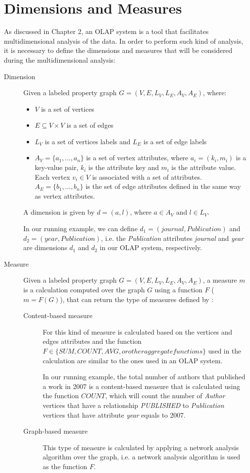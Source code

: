 \section{Dimensions and Measures}

As discussed in Chapter 2, an OLAP system is a tool that facilitates multidimensional analysis of the data. In order to perform such kind of analysis, it is necessary to define the dimensions and measures that will be considered during the multidimensional analysis:
\begin{description}
\item[Dimension] Given a labeled property graph $G = (V, E, L_V, L_E, A_V, A_E)$, where:
\begin{itemize}
\item $V$ is a set of vertices
\item $E \subseteq V \times V$ is a set of edges
\item $L_V$ is a set of vertices labels and $L_E$ is a set of edge labels
\item $A_V = \{a_1, \dots, a_n\}$ is a set of vertex attributes, where $a_i = (k_i, m_i)$ is a key-value pair, $k_i$ is the attribute key and $m_i$ is the attribute value. Each vertex $v_i \in V$ is associated with a set of attributes. $A_E = \{b_1, \dots, b_n\}$ is the set of edge attributes defined in the same way as vertex attributes.
\end{itemize}
 A dimension is given by $d = (a, l)$, where $a \in A_V$ and $l \in L_V$.

In our running example, we can define $d_1 = (journal, Publication)$ and $d_2 = (year, Publication)$, i.e. the \emph{Publication} attributes \emph{journal} and \emph{year} are dimensions $d_1$ and $d_2$ in our OLAP system, respectively.

\item[Measure] Given a labeled property graph $G = (V, E, L_V, L_E, A_V, A_E)$, a measure $m$ is a calculation computed over the graph $G$ using a function $F$ ($m=F(G)$), that can return the type of measures defined by  \cite{ghrab2015framework}:
\begin{description}
\item[Content-based measure] For this kind of measure is calculated based on the vertices and edges attributes and the function $F \in \{SUM, COUNT, AVG, or other aggregate functions\}$ used in the calculation are similar to the ones used in an OLAP system.

In our running example, the total number of authors that published a work in 2007 is a content-based measure that is calculated using the function $COUNT$, which will count the number of \emph{Author} vertices that have a relationship \emph{PUBLISHED} to \emph{Publication} vertices that have attribute \emph{year} equals to 2007.
\item[Graph-based measure] This type of measure is calculated by applying a network analysis algorithm over the graph, i.e. a network analysis algorithm is used as the function $F$.


\end{description}
\end{description}
